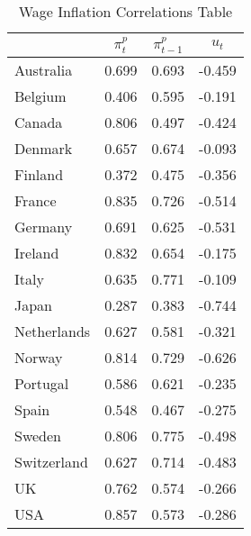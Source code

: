 \begin{table}[htbp]
\caption{\label{T_Correlation} Wage Inflation Correlations Table}\centering\medskip
\begin{tabular}{lccc} \hline \hline
 & $\pi_t^p$  & $\pi_{t-1}^p$  & $u_t$  \\  \hline 
Australia &     0.699 &     0.693 &    -0.459 \\  
Belgium &     0.406 &     0.595 &    -0.191 \\  
Canada &     0.806 &     0.497 &    -0.424 \\  
Denmark &     0.657 &     0.674 &    -0.093 \\  
Finland &     0.372 &     0.475 &    -0.356 \\  
France &     0.835 &     0.726 &    -0.514 \\  
Germany &     0.691 &     0.625 &    -0.531 \\ 
Ireland &     0.832 &     0.654 &    -0.175 \\ 
Italy &     0.635 &     0.771 &    -0.109 \\  
Japan &     0.287 &     0.383 &    -0.744 \\  
Netherlands &     0.627 &     0.581 &    -0.321 \\  
Norway &     0.814 &     0.729 &    -0.626 \\  
Portugal &     0.586 &     0.621 &    -0.235 \\  
Spain &     0.548 &     0.467 &    -0.275 \\  
Sweden &     0.806 &     0.775 &    -0.498 \\  
Switzerland &     0.627 &     0.714 &    -0.483 \\  
UK &     0.762 &     0.574 &    -0.266 \\  
USA &     0.857 &     0.573 &    -0.286 \\   
\hline \hline \end{tabular}
\\
\end{table}
